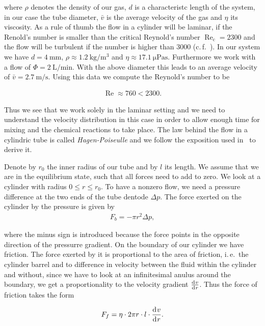 where $\rho$ denotes the density of our gas, $d$ is a characteristc
length of the system, in our case the tube diameter, $\bar v$ is the
average velocity of the gas and $\eta$ its viscosity. As a rule of
thumb the flow in a cylinder will be laminar, if the Renold's number
is smaller than the critical Reynold's number
$\operatorname{Re}_{\text{c}} = 2300$ and the flow will be turbulent
if the number is higher than $3000$ (c.\,f.~\cite{maschbau}). In our
system we have $d = \SI{4}{\milli\meter}$, $\rho \approx
\SI{1.2}{\kilo\gram\per\cubic\meter}$ and $\eta \approx
\SI{17.1}{\micro\pascal\second}$. Furthermore we work with a flow of
$\Phi = \SI{2}{\liter\per\minute}$. With the above diameter this
leads to an average velocity of $\bar v =
\SI{2.7}{\meter\per\second}$. Using this data we compute the Reynold's
number to be

\begin{align*}
  \operatorname{Re} \approx 760 < 2300.
\end{align*}

Thus we see that we work solely in the laminar setting and we need to
understand the velocity distribution in this case in order to allow
enough time for mixing and the chemical reactions to take place. The
law behind the flow in a cylindric tube is called
\emph{Hagen-Poiseulle} and we follow the exposition used
in~\cite{gerthsen} to derive it.

Denote by $r_0$ the inner radius of our tube and by $l$ its length. We
assume that we are in the equilibrium state, such that all forces need
to add to zero. We look at a cylinder with radius $0 \leq r \leq
r_0$. To have a nonzero flow, we need a pressure difference at the two
ends of the tube dentode $\Delta p$. The force exerted on the cylinder
by the pressure is given by
\begin{align*}
  F_b = - \pi r^2 \Delta p,
\end{align*}

where the minus sign is introduced because the force points in the
opposite direction of the pressurre gradient. On the boundary of our
cylinder we have friction. The force exerted by 
it is proportional to the area of friction, i.\,e.\ the cylinder
barrel and to difference in velocity between the fluid within the
cylinder and without, since we have to look at an infinitesimal anulus
around the boundary, we get a proportionality to the velocity gradient
$\frac{\d[v]}{\d[r]}$. Thus the force of friction takes the form

\begin{align*}
  F_f = \eta \cdot 2\pi r \cdot l \cdot \frac{\d[v]}{\d[r]}.
\end{align*}

